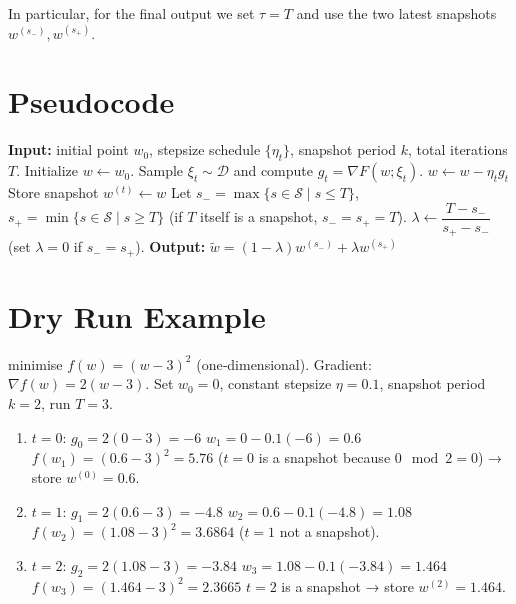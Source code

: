 \documentclass{article}
\begin{document}
In particular, for the final output we set $\tau=T$ and use the two
latest snapshots $w^{(s_{-})},w^{(s_{+})}$.

\section*{Pseudocode}
\begin{algorithm}[H]
\caption{Interpolated Snapshot Averaging (ISA)}
\begin{algorithmic}[1]
\STATE \textbf{Input:} initial point $w_0$, stepsize schedule $\{\eta_t\}$,
snapshot period $k$, total iterations $T$.
\STATE Initialize $w \leftarrow w_0$.
    \STATE Sample $\xi_t\sim\mathcal{D}$ and compute $g_t=\nabla F(w;\xi_t)$.
    \STATE $w \leftarrow w - \eta_t g_t$ \hfill{}
        \STATE Store snapshot $w^{(t)}\leftarrow w$ \hfill{}
    \ENDIF
\ENDFOR
\STATE Let $s_{-}=\max\{s\in\mathcal{S}\mid s\le T\}$,
      $s_{+}=\min\{s\in\mathcal{S}\mid s\ge T\}$ (if $T$ itself is a snapshot,
      $s_{-}=s_{+}=T$).
\STATE $\lambda\gets \dfrac{T-s_{-}}{s_{+}-s_{-}}$ (set $\lambda=0$ if $s_{-}=s_{+}$).
\STATE \textbf{Output: } $\displaystyle \tilde w = (1-\lambda)w^{(s_{-})}+ \lambda w^{(s_{+})}$ \hfill{}
\end{algorithmic}
\end{algorithm}

\section*{Dry Run Example}
 minimise $f(w)=(w-3)^2$ (one‑dimensional).  
Gradient: $\nabla f(w)=2(w-3)$.  
Set $w_0=0$, constant stepsize $\eta=0.1$, snapshot period $k=2$, run $T=3$.

\begin{enumerate}[label=\arabic*.]
\item $t=0$: $g_0=2(0-3)=-6$  
      $w_1 = 0 -0.1(-6)=0.6$  
      $f(w_1)=(0.6-3)^2=5.76$  
      ($t=0$ is a snapshot because $0\!\!\mod 2=0$) → store $w^{(0)}=0.6$.
\item $t=1$: $g_1=2(0.6-3)=-4.8$  
      $w_2 = 0.6 -0.1(-4.8)=1.08$  
      $f(w_2)=(1.08-3)^2=3.6864$  
      ($t=1$ not a snapshot).
\item $t=2$: $g_2=2(1.08-3)=-3.84$  
      $w_3 = 1.08 -0.1(-3.84)=1.464$  
      $f(w_3)=(1.464-3)^2=2.3665$  
      $t=2$ is a snapshot → store $w^{(2)}=1.464$.
\end{enumerate}
\end{document}
